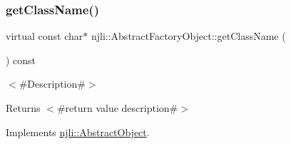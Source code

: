 \mbox{\label{classnjli_1_1_abstract_factory_object_af4151e41b80d5bc3fc42822c67fc2278}} 
\subsubsection{\texorpdfstring{get\+Class\+Name()}{getClassName()}}
{\footnotesize\ttfamily virtual const char$\ast$ njli\+::\+Abstract\+Factory\+Object\+::get\+Class\+Name (\begin{DoxyParamCaption}{ }\end{DoxyParamCaption}) const\hspace{0.3cm}{\ttfamily [pure virtual]}}

$<$\#\+Description\#$>$

\begin{DoxyReturn}{Returns}
$<$\#return value description\#$>$ 
\end{DoxyReturn}


Implements \mbox{\hyperlink{classnjli_1_1_abstract_object_afdabb48c4bf763e297ffe810b433a863}{njli\+::\+Abstract\+Object}}.



